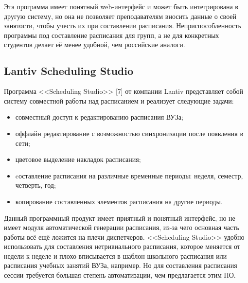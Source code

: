 Эта программа имеет понятный web-интерфейс и может быть интегрирована в другую систему, но она не позволяет преподавателям вносить данные о своей занятости, чтобы учесть их при составлении расписания. Неприспособленность программы под составление расписания для групп, а не для конкретных студентов делает её менее удобной, чем российские аналоги.

\subsection {Lantiv Scheduling Studio} 
Программа <<Scheduling Studio>> [7] от компании Lantiv представляет собой систему совместной работы над расписанием и реализует следующие задачи:

\begin{itemize}
	\item совместный доступ к редактированию расписания ВУЗа;
	\item оффлайн редактирование с возможностью синхронизации после появления в сети;
	\item цветовое выделение накладок расписания;
	\item cоставление расписания на различные временные периоды: неделя, семестр, четверть, год;
	\item копирование составленных элементов расписания на другие периоды.
\end{itemize}

Данный программный продукт имеет приятный и понятный интерфейс, но не имеет модуля автоматической генерации расписания, из-за чего основная часть работы всё ещё ложится на плечи диспетчеров. <<Scheduling Studio>> удобно использовать для составления нетривиального расписания, которое меняется от недели к неделе и плохо вписывается в шаблон школьного расписания или расписания учебных занятий ВУЗа, например. Но для составления расписания сессии требуется большая степень автоматизации, чем предлагается этим ПО.

